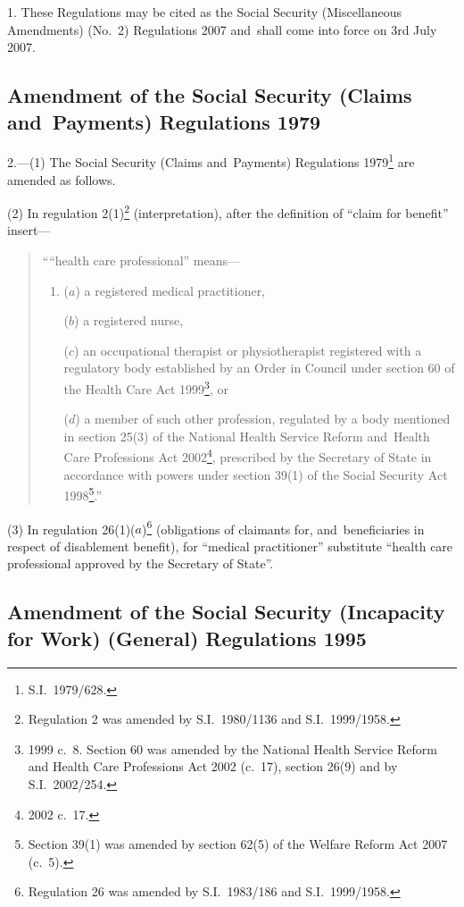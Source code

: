 \documentclass[12pt,a4paper]{article}
\begin{document}
1.  These Regulations may be cited as the Social Security (Miscellaneous Amendments) (No.~2) Regulations 2007 and~shall come into force on 3rd July 2007.

\subsection[2. Amendment of the Social Security (Claims and~Payments) Regulations 1979]{Amendment of the Social Security (Claims and~Payments) Regulations 1979}

2.---(1)  The Social Security (Claims and~Payments) Regulations 1979\footnote{S.I.~1979/628.} are amended as follows.

(2) In regulation 2(1)\footnote{Regulation 2 was amended by S.I.~1980/1136 and S.I.~1999/1958.} (interpretation), after the definition of “claim for benefit” insert—
\begin{quotation}
““health care professional” means—
\begin{enumerate}\item[]
($a$) 
a registered medical practitioner,

($b$) 
a registered nurse,

($c$) 
an occupational therapist or physiotherapist registered with a regulatory body established by an Order in Council under section 60 of the Health Care Act 1999\footnote{1999 c.~8. Section 60 was amended by the National Health Service Reform and Health Care Professions Act 2002 (c.~17), section 26(9) and by S.I.~2002/254.}, or

($d$) 
a member of such other profession, regulated by a body mentioned in section 25(3) of the National Health Service Reform and~Health Care Professions Act 2002\footnote{2002 c.~17.}, prescribed by the Secretary of State in accordance with powers under section 39(1) of the Social Security Act 1998\footnote{Section 39(1) was amended by section 62(5) of the Welfare Reform Act 2007 (c.~5).}.”
\end{enumerate}
\end{quotation}

(3) In regulation 26(1)($a$)\footnote{Regulation 26 was amended by S.I.~1983/186 and S.I.~1999/1958.} (obligations of claimants for, and~beneficiaries in respect of disablement benefit), for “medical practitioner” substitute “health care professional approved by the Secretary of State”.

\subsection[3. Amendment of the Social Security (Incapacity for Work) (General) Regulations 1995]{\sloppy{} Amendment of the Social Security (Incapacity for Work) (General) Regulations 1995}
\end{document}
